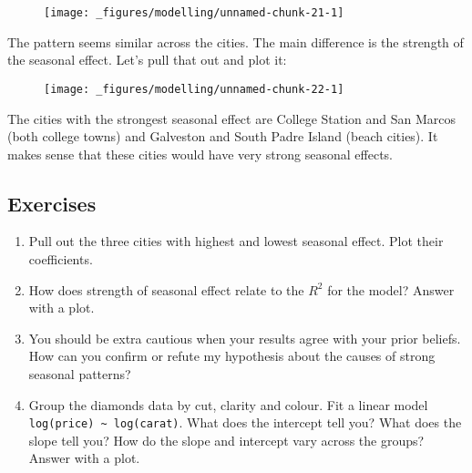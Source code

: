 \begin{figure}[H]
  \centering
  \texttt{[image: \_figures/modelling/unnamed-chunk-21-1]}
\end{figure}

The pattern seems similar across the cities. The main difference is the
strength of the seasonal effect. Let's pull that out and plot it:

\begin{Shaded}
\end{Shaded}

\begin{figure}[H]
  \centering
  \texttt{[image: \_figures/modelling/unnamed-chunk-22-1]}
\end{figure}

The cities with the strongest seasonal effect are College Station and
San Marcos (both college towns) and Galveston and South Padre Island
(beach cities). It makes sense that these cities would have very strong
seasonal effects.

\subsection{Exercises}\label{exercises-3}

\begin{enumerate}
\def\labelenumi{\arabic{enumi}.}
\item
  Pull out the three cities with highest and lowest seasonal effect.
  Plot their coefficients.
\item
  How does strength of seasonal effect relate to the \(R^2\) for the
  model? Answer with a plot.
\item
  You should be extra cautious when your results agree with your prior
  beliefs. How can you confirm or refute my hypothesis about the causes
  of strong seasonal patterns?
\item
  Group the diamonds data by cut, clarity and colour. Fit a linear model
  \texttt{log(price)\ \textasciitilde{}\ log(carat)}. What does the
  intercept tell you? What does the slope tell you? How do the slope and
  intercept vary across the groups? Answer with a plot.
\end{enumerate}

